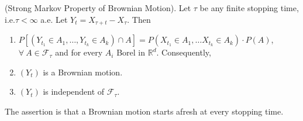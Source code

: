 \begin{theorem*}
(Strong Markov Property of Brownian Motion). Let $\tau$ be any finite
  stopping time, i.e.\@ $\tau<\infty$ a.e. Let
  $Y_{t}=X_{\tau+t}-X_{\tau}$. Then
\begin{enumerate}
\item $P[(Y_{t_{1}}\in A_{1},\ldots,Y_{t_{k}}\in A_{k})\cap
  A]=P(X_{t_{1}}\in A_{1},\ldots X_{t_{k}}\in A_{k})\cdot P(A)$,
  $\forall\ A\in \mathscr{F}_{\tau}$ and for every $A_{i}$ Borel in
  $\mathbb{R}^{d}$. Consequently,

\item $(Y_{t})$ is a Brownian motion.

\item $(Y_{t})$ is independent of $\mathscr{F}_{\tau}$.
\end{enumerate}
\end{theorem*}

The assertion is that a Brownian motion starts afresh at every
stopping time.

